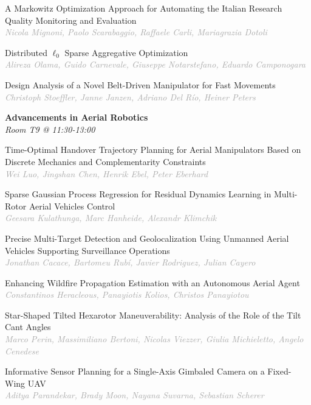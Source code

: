 \begin{multicols*}{2}
\small A Markowitz Optimization Approach for Automating the Italian Research Quality Monitoring and Evaluation\\ 
\footnotesize \textcolor{darkgray}{\textit{Nicola Mignoni, Paolo  Scarabaggio, Raffaele  Carli, Mariagrazia  Dotoli}}

\small Distributed $\ell_0$ Sparse Aggregative Optimization\\ 
\footnotesize \textcolor{darkgray}{\textit{Alireza Olama, Guido  Carnevale, Giuseppe  Notarstefano, Eduardo  Camponogara}}

\small Design Analysis of a Novel Belt-Driven Manipulator for Fast Movements\\ 
\footnotesize \textcolor{darkgray}{\textit{Christoph Stoeffler, Janne  Janzen, Adriano  Del Río, Heiner  Peters}}

\normalsize \textbf{Advancements in Aerial Robotics}\\
\small \textit{Room T9 @ 11:30-13:00}

\small Time-Optimal Handover Trajectory Planning for Aerial Manipulators Based on Discrete Mechanics and Complementarity Constraints\\ 
\footnotesize \textcolor{darkgray}{\textit{Wei Luo, Jingshan  Chen, Henrik  Ebel, Peter  Eberhard}}

\small Sparse Gaussian Process Regression for Residual Dynamics Learning in Multi-Rotor Aerial Vehicles Control\\ 
\footnotesize \textcolor{darkgray}{\textit{Geesara Kulathunga, Marc  Hanheide, Alexandr  Klimchik}}

\small Precise Multi-Target Detection and Geolocalization Using Unmanned Aerial Vehicles Supporting Surveillance Operations\\ 
\footnotesize \textcolor{darkgray}{\textit{Jonathan Cacace, Bartomeu  Rubí, Javier  Rodriguez, Julian  Cayero}}

\small Enhancing Wildfire Propagation Estimation with an Autonomous Aerial Agent\\ 
\footnotesize \textcolor{darkgray}{\textit{Constantinos Heracleous, Panayiotis  Kolios, Christos  Panayiotou}}

\small Star-Shaped Tilted Hexarotor Maneuverability: Analysis of the Role of the Tilt Cant Angles\\ 
\footnotesize \textcolor{darkgray}{\textit{Marco Perin, Massimiliano  Bertoni, Nicolas  Viezzer, Giulia  Michieletto, Angelo  Cenedese}}

\small Informative Sensor Planning for a Single-Axis Gimbaled Camera on a Fixed-Wing UAV\\ 
\footnotesize \textcolor{darkgray}{\textit{Aditya Parandekar, Brady  Moon, Nayana  Suvarna, Sebastian  Scherer}}


\end{multicols*}
